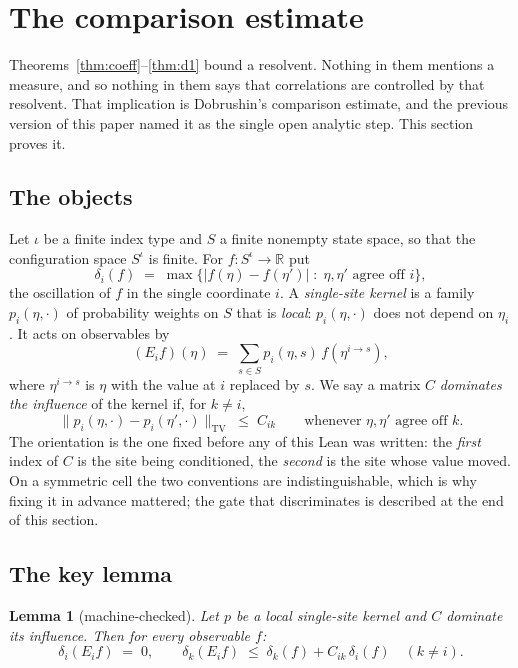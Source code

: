\documentclass[11pt]{article}
\newtheorem{lemma}[theorem]{Lemma}
\theoremstyle{definition}
\newcommand{\R}{\mathbb{R}}
\begin{document}
\section{The comparison estimate}
\label{sec:comparison}

Theorems~\ref{thm:coeff}--\ref{thm:d1} bound a resolvent.  Nothing in them
mentions a measure, and so nothing in them says that correlations are
controlled by that resolvent.  That implication is Dobrushin's comparison
estimate, and the previous version of this paper named it as the single open
analytic step.  This section proves it.

\subsection{The objects}

Let $\iota$ be a finite index type and $S$ a finite nonempty state space, so
that the configuration space $S^{\iota}$ is finite.  For $f:S^{\iota}\to\R$ put
\[
  \delta_i(f)\;=\;\max\bigl\{|f(\eta)-f(\eta')| \;:\;
    \eta,\eta'\text{ agree off }i\bigr\},
\]
the oscillation of $f$ in the single coordinate $i$.  A \emph{single-site
kernel} is a family $p_i(\eta,\cdot)$ of probability weights on $S$ that is
\emph{local}: $p_i(\eta,\cdot)$ does not depend on $\eta_i$.  It acts on
observables by
\[
  (E_i f)(\eta)\;=\;\sum_{s\in S}p_i(\eta,s)\,f(\eta^{i\to s}),
\]
where $\eta^{i\to s}$ is $\eta$ with the value at $i$ replaced by $s$.  We say a
matrix $C$ \emph{dominates the influence} of the kernel if, for $k\ne i$,
\[
  \bigl\|p_i(\eta,\cdot)-p_i(\eta',\cdot)\bigr\|_{\mathrm{TV}}\;\le\;C_{ik}
  \qquad\text{whenever }\eta,\eta'\text{ agree off }k .
\]
The orientation is the one fixed before any of this Lean was written: the
\emph{first} index of $C$ is the site being conditioned, the \emph{second} is
the site whose value moved.  On a symmetric cell the two conventions are
indistinguishable, which is why fixing it in advance mattered; the gate that
discriminates is described at the end of this section.

\subsection{The key lemma}

\begin{lemma}[machine-checked]
\label{lem:key}
Let $p$ be a local single-site kernel and $C$ dominate its influence.  Then for
every observable $f$:
\[
  \delta_i(E_i f)\;=\;0,
  \qquad
  \delta_k(E_i f)\;\le\;\delta_k(f)+C_{ik}\,\delta_i(f)\quad(k\ne i).
\]
\end{lemma}
\end{document}
